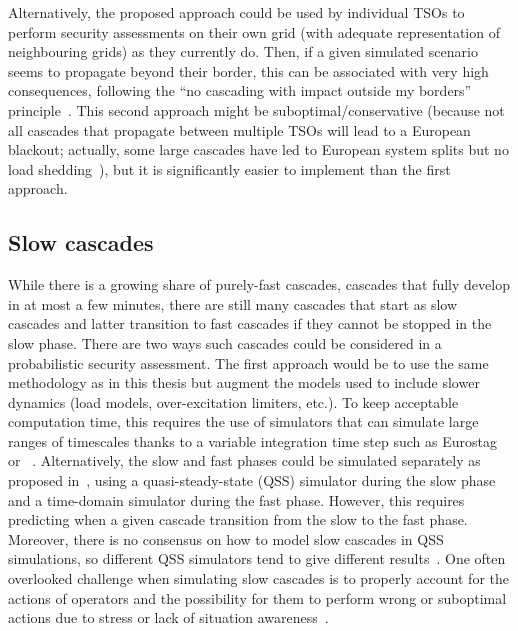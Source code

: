 Alternatively, the proposed approach could be used by individual TSOs to perform security assessments on their own grid (with adequate representation of neighbouring grids) as they currently do. Then, if a given simulated scenario seems to propagate beyond their border, this can be associated with very high consequences, following the ``no cascading with impact outside my borders'' principle~\cite{UCTE_Probabilistic}. This second approach might be suboptimal/conservative (because not all cascades that propagate between multiple TSOs will lead to a European blackout; actually, some large cascades have led to European system splits but no load shedding~\cite{ENTSOESplitJan2021}), but it is significantly easier to implement than the first approach.


\subsection*{Slow cascades}

While there is a growing share of purely-fast cascades, \ie cascades that fully develop in at most a few minutes, there are still many cascades that start as slow cascades and latter transition to fast cascades if they cannot be stopped in the slow phase. There are two ways such cascades could be considered in a probabilistic security assessment. The first approach would be to use the same methodology as in this thesis but augment the models used to include slower dynamics (load models, over-excitation limiters, etc.). To keep acceptable computation time, this requires the use of simulators that can simulate large ranges of timescales thanks to a variable integration time step such as Eurostag~\cite{STAG} or \Dynawo{}~\cite{Dynawo}. Alternatively, the slow and fast phases could be simulated separately as proposed in~\cite{TwoLevelPSA}, using a quasi-steady-state (QSS) simulator during the slow phase and a time-domain simulator during the fast phase. However, this requires predicting when a given cascade transition from the slow to the fast phase. Moreover, there is no consensus on how to model slow cascades in QSS simulations, so different QSS simulators tend to give different results~\cite{Benchmarking2018}. One often overlooked challenge when simulating slow cascades is to properly account for the actions of operators and the possibility for them to perform wrong or suboptimal actions due to stress or lack of situation awareness~\cite{Shahab_HRA, Panteli_Awareness}.

